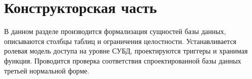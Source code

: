 
\chapter{Конструкторская часть}

В данном разделе производится формализация сущностей базы данных, описываются столбцы таблиц и ограничения целостности. Устанавливается ролевая модель доступа на уровне СУБД, проектируются триггеры и хранимая функция. Проводится проверка соответствия спроектированной базы данных третьей нормальной форме.








